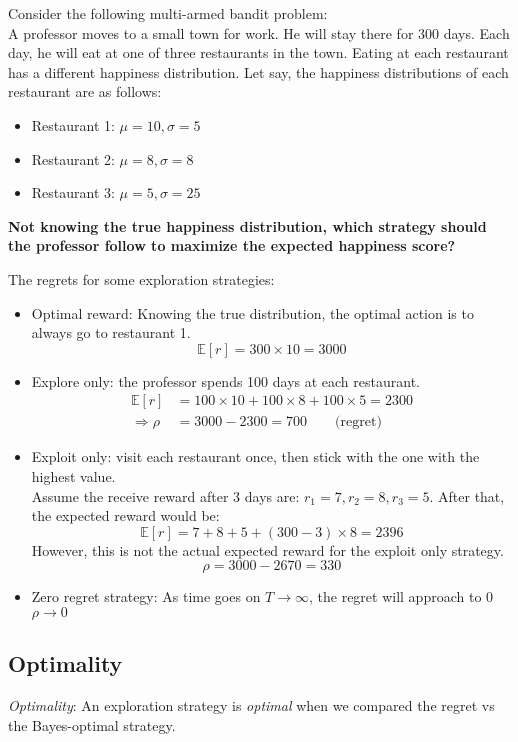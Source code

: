  Consider the following multi-armed bandit problem:\\
A professor moves to a small town for work. He will stay there for 300 days. Each day, he will eat at one of three restaurants in the town. Eating at each restaurant has a different happiness distribution. Let say, the happiness distributions of each restaurant are as follows:
\begin{itemize}
	\item Restaurant 1: $\mu=10, \sigma=5$
	\item Restaurant 2: $\mu=8, \sigma=8$
	\item Restaurant 3: $\mu=5, \sigma=25$
\end{itemize}
\textbf{Not knowing the true happiness distribution, which strategy should the professor follow to maximize the expected happiness score?}

The regrets for some exploration strategies:
\begin{itemize}
	\item Optimal reward: Knowing the true distribution, the optimal action is to always go to restaurant 1.
	\[ \mathbb{E}[r] = 300 \times 10 = 3000\]
	\item Explore only: the professor spends 100 days at each restaurant.
	\begin{align*}
		\mathbb{E}[r] &= 100 \times 10 + 100 \times 8 + 100 \times 5 = 2300\\
		\Rightarrow \rho &= 3000 - 2300 = 700 \qquad \text{(regret)}
	\end{align*}
	\item Exploit only: visit each restaurant once, then stick with the one with the highest value.\\
	Assume the receive reward after 3 days are: $r_1 = 7, r_2 = 8, r_3 = 5$. After that, the expected reward would be:
	\[ \mathbb{E}[r] = 7 + 8 + 5 + (300 - 3) \times 8 = 2396 \]
	However, this is not the actual expected reward for the exploit only strategy.
	\[\rho = 3000 - 2670 = 330\]
	\item Zero regret strategy: As time goes on $T\rightarrow \infty$, the regret will approach to 0 $\rho \rightarrow0$
\end{itemize}

\subsection{Optimality}
\textit{Optimality}: An exploration strategy is \textit{optimal} when we compared the regret \ac{vs} the Bayes-optimal strategy. \todo{}

